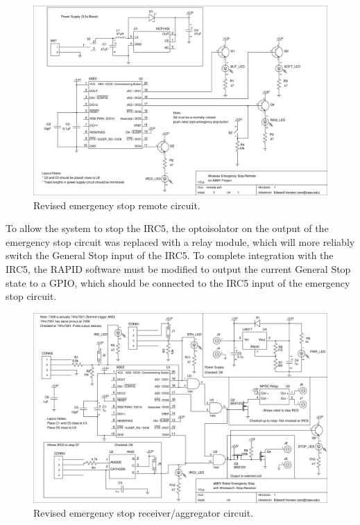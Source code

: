 \documentclass[]{cwru} %
\begin{document}
\begin{figure}[ht]
\centering
\includegraphics[width=6.0in]{estop_remote_revised}
\caption{Revised emergency stop remote circuit.}
\label{fig:estop-remote-revised}
\end{figure}

To allow the system to stop the IRC5, the optoisolator on the output of
the emergency stop circuit was replaced with a relay module, which will
more reliably switch the General Stop input of the IRC5. To complete
integration with the IRC5, the RAPID software must be modified to output
the current General Stop state to a GPIO, which should be connected to
the IRC5 input of the emergency stop circuit.

\begin{figure}[ht]
\centering
\includegraphics[width=6.0in]{estop_receiver_revised}
\caption{Revised emergency stop receiver/aggregator circuit.}
\label{fig:estop-receiver-revised}
\end{figure}
\end{document}
